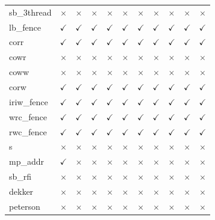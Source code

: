 \documentclass[10pt]{article}
\newcommand{\cmark}{$\checkmark$}
\newcommand{\xmark}{$\times$}
\begin{document}
{\begin{table}[p]
\begin{tabular}{l cccc cccccc}
sb\_3thread & \xmark & \xmark & \xmark & \xmark & \xmark & \xmark & \xmark & \xmark & \xmark & \xmark \\
lb\_fence & \cmark & \cmark & \cmark & \cmark & \cmark & \cmark & \cmark & \cmark & \cmark & \cmark \\
corr & \cmark & \cmark & \cmark & \cmark & \cmark & \cmark & \cmark & \cmark & \cmark & \cmark \\
cowr & \xmark & \xmark & \xmark & \xmark & \xmark & \xmark & \xmark & \xmark & \xmark & \xmark \\
coww & \xmark & \xmark & \xmark & \xmark & \xmark & \xmark & \xmark & \xmark & \xmark & \xmark \\
corw & \cmark & \cmark & \cmark & \cmark & \cmark & \cmark & \cmark & \cmark & \cmark & \cmark \\
iriw\_fence & \cmark & \cmark & \cmark & \cmark & \cmark & \cmark & \cmark & \cmark & \cmark & \cmark \\
wrc\_fence & \cmark & \cmark & \cmark & \cmark & \cmark & \cmark & \cmark & \cmark & \cmark & \cmark \\
rwc\_fence & \cmark & \cmark & \cmark & \cmark & \cmark & \cmark & \cmark & \cmark & \cmark & \cmark \\
s & \xmark & \xmark & \xmark & \xmark & \xmark & \xmark & \xmark & \xmark & \xmark & \xmark \\
mp\_addr & \cmark & \xmark & \xmark & \xmark & \xmark & \xmark & \xmark & \xmark & \xmark & \xmark \\
sb\_rfi & \xmark & \xmark & \xmark & \xmark & \xmark & \xmark & \xmark & \xmark & \xmark & \xmark \\
dekker & \xmark & \xmark & \xmark & \xmark & \xmark & \xmark & \xmark & \xmark & \xmark & \xmark \\
peterson & \xmark & \xmark & \xmark & \xmark & \xmark & \xmark & \xmark & \xmark & \xmark & \xmark \\
\bottomrule
\end{tabular}
\end{table}
}
\end{document}
